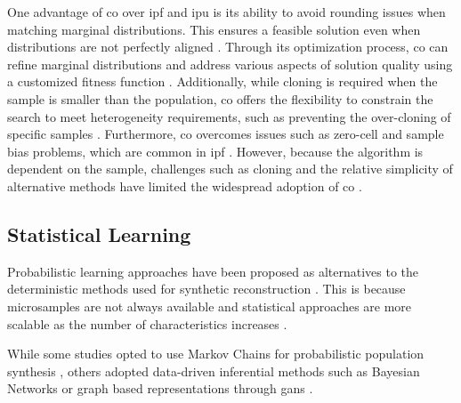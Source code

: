 ﻿\documentclass[../main.tex]{subfiles}
\begin{document}
One advantage of \gls{co} over \gls{ipf} and \gls{ipu} is its ability to avoid rounding issues when matching marginal distributions. This ensures a feasible solution even when distributions are not perfectly aligned \citep{Duran-Heras2018ComparisonMethod}. Through its optimization process, \gls{co} can refine marginal distributions and address various aspects of solution quality using a customized fitness function \citep{Huang2001AMicrodata.}. Additionally, while cloning is required when the sample is smaller than the population, \gls{co} offers the flexibility to constrain the search to meet heterogeneity requirements, such as preventing the over-cloning of specific samples \citep{Zhuge2017ATransportation, Ma2015SyntheticValidations, Harland2012CreatingTechniques}. Furthermore, \gls{co} overcomes issues such as zero-cell and sample bias problems, which are common in \gls{ipf} \citep{Kim2016AModel}. However, because the algorithm is dependent on the sample, challenges such as cloning and the relative simplicity of alternative methods have limited the widespread adoption of \gls{co} \citep{Wang2021ImprovedPopulations}.


\subsection{Statistical Learning} \label{sec:bay}
Probabilistic learning approaches have been proposed as alternatives to the deterministic methods used for synthetic reconstruction \citep{Farooq2013SimulationSynthesis, Ilahi2019IntegratingJakarta, Sun2015ASynthesis, Zhang2019ConnectedSimulation}. This is because microsamples are not always available and statistical approaches are more scalable as the number of characteristics increases \citep{Borysov2019HowSynthesis}. 

While some studies opted to use Markov Chains for probabilistic population synthesis \citep{Farooq2013SimulationSynthesis}, others adopted data-driven inferential methods such as Bayesian Networks \citep{Sun2015ASynthesis,Zhang2019ConnectedSimulation} or graph based representations through \glspl{gan} \citep{Lederrey2022DATGAN:Data}. 
\end{document}
